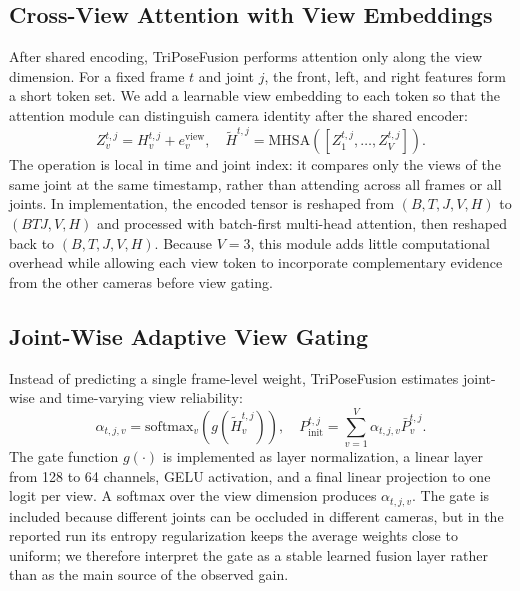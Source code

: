 \documentclass[runningheads]{llncs}
\begin{document}
\subsection{Cross-View Attention with View Embeddings}
After shared encoding, TriPoseFusion performs attention only along the view dimension. For a fixed frame $t$ and joint $j$, the front, left, and right features form a short token set. We add a learnable view embedding to each token so that the attention module can distinguish camera identity after the shared encoder:
\begin{equation}
Z_{v}^{t,j}=H_{v}^{t,j}+e_{v}^{\mathrm{view}},\quad
\tilde{H}^{t,j}=\mathrm{MHSA}\left([Z_{1}^{t,j},\dots,Z_{V}^{t,j}]\right).
\label{equ:viewattn}
\end{equation}
The operation is local in time and joint index: it compares only the views of the same joint at the same timestamp, rather than attending across all frames or all joints. In implementation, the encoded tensor is reshaped from $(B,T,J,V,H)$ to $(BTJ,V,H)$ and processed with batch-first multi-head attention, then reshaped back to $(B,T,J,V,H)$. Because $V=3$, this module adds little computational overhead while allowing each view token to incorporate complementary evidence from the other cameras before view gating.

\subsection{Joint-Wise Adaptive View Gating}
Instead of predicting a single frame-level weight, TriPoseFusion estimates joint-wise and time-varying view reliability:
\begin{equation}
\alpha_{t,j,v}=\mathrm{softmax}_{v}\left(g(\tilde{H}_{v}^{t,j})\right),\quad
P_{\mathrm{init}}^{t,j}=\sum_{v=1}^{V}\alpha_{t,j,v}\bar{P}_{v}^{t,j}.
\label{equ:gating}
\end{equation}
The gate function $g(\cdot)$ is implemented as layer normalization, a linear layer from 128 to 64 channels, GELU activation, and a final linear projection to one logit per view. A softmax over the view dimension produces $\alpha_{t,j,v}$. The gate is included because different joints can be occluded in different cameras, but in the reported run its entropy regularization keeps the average weights close to uniform; we therefore interpret the gate as a stable learned fusion layer rather than as the main source of the observed gain.
\end{document}

